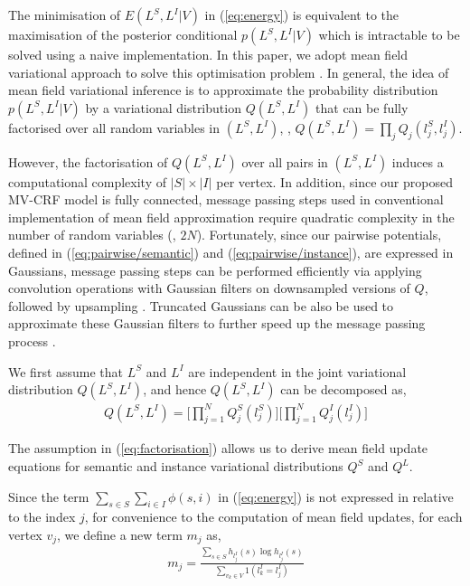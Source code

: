 \documentclass[10pt,twocolumn,letterpaper]{article}
\begin{document}
The minimisation of $E(L^S,L^I|V)$ in (\ref{eq:energy}) is equivalent to the
maximisation of the posterior conditional $p(L^S,L^I|V)$ which is intractable to
be solved using a naive implementation. In this paper, we adopt mean field
variational approach to solve this optimisation problem
\cite{wainwright-graphical-ftml08}. In general, the idea of mean field
variational inference is to approximate the probability distribution
$p(L^S,L^I|V)$ by a variational distribution $Q(L^S, L^I)$ that can be fully
factorised over all random variables in $(L^S, L^I)$, \ie,
$Q(L^S,L^I)=\prod_j Q_j(l^S_j,l^I_j)$.

However, the factorisation of $Q(L^S, L^I)$ over all pairs in $(L^S, L^I)$
induces a computational complexity of $|S|\times|I|$ per vertex. In addition,
since our proposed MV-CRF model is fully connected, message passing steps used
in conventional implementation of mean field approximation require quadratic
complexity in the number of random variables (\ie, $2N$). Fortunately, since our
pairwise potentials, defined in (\ref{eq:pairwise/semantic}) and
(\ref{eq:pairwise/instance}), are expressed in Gaussians, message passing steps
can be performed efficiently via applying convolution operations with Gaussian
filters on downsampled versions of $Q$, followed by upsampling
\cite{krahenbuhl-densecrf-nips11}. Truncated Gaussians can be also be used to
approximate these Gaussian filters to further speed up the message passing
process \cite{paris-bilateral-eccv06}.

We first assume that $L^S$ and $L^I$ are independent in the joint variational
distribution $Q(L^S, L^I)$, and hence $Q(L^S, L^I)$ can be decomposed as,
\begin{align}
  \label{eq:factorisation}
  Q(L^S,L^I)=\bigg[ \prod_{j=1}^N Q^S_j(l^S_j) \bigg] \bigg[ \prod_{j=1}^N Q^I_j(l^I_j) \bigg]
\end{align}

The assumption in (\ref{eq:factorisation}) allows us to derive mean field update
equations for semantic and instance variational distributions $Q^S$ and $Q^L$.

Since the term $\sum_{s \in S} \sum_{i \in I} \phi(s,i)$ in (\ref{eq:energy}) is
not expressed in relative to the index $j$, for convenience to the computation
of mean field updates, for each vertex $v_j$, we define a new term $m_j$ as,
\begin{align}
  \label{eq:auxilary}
  m_j = \frac{\sum_{s \in S} h_{l^I_j}(s) \log h_{l^I_j}(s)}{\sum_{v_k \in V} 1(l^I_k=l^I_j)}
\end{align}
\end{document}
